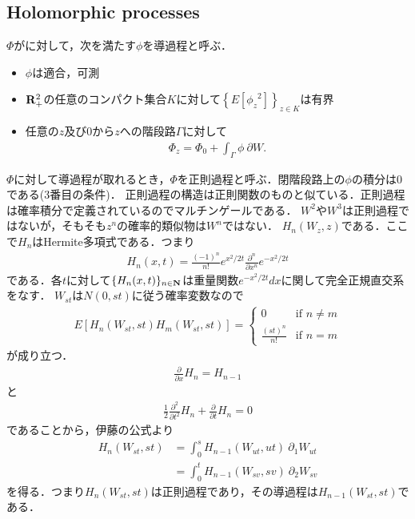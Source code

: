 \subsection{Holomorphic processes}
	$\Phi$がに対して，次を満たす$\phi$を導過程と呼ぶ．
	\begin{itemize}
		\item $\phi$は適合，可測
		\item $\mathbf{R}_{+}^{2}$の任意のコンパクト集合$K$に対して$\left\{E[{\phi_{z}}^{2}]\right\}_{z \in K}$は有界
		\item 任意の$z$及び$0$から$z$への階段路$\Gamma$に対して
			\begin{align}
				\Phi_{z} = \Phi_{0} + \int_{\Gamma} \phi\ \partial W.
			\end{align}
	\end{itemize}
	$\Phi$に対して導過程が取れるとき，$\Phi$を正則過程と呼ぶ．閉階段路上の$\phi$の積分は$0$である(3番目の条件)．
	正則過程の構造は正則関数のものと似ている．正則過程は確率積分で定義されているのでマルチンゲールである．
	$W^{2}$や$W^{3}$は正則過程ではないが，そもそも$z^{n}$の確率的類似物は$W^{n}$ではない．
	$H_{n}(W_{z},z)$である．ここで$H_{n}$はHermite多項式である．つまり
	\begin{align}
		H_{n}(x,t) = \frac{(-1)^{n}}{n!} e^{x^{2}/2t} \frac{\partial^{n}}{\partial x^{n}} e^{-x^{2}/2t}
	\end{align}
	である．各$t$に対して$\{H_{n}(x,t)\}_{n \in \mathbf{N}}$は重量関数$e^{-x^{2}/2t} dx$に関して完全正規直交系をなす．
	$W_{st}$は$N(0,st)$に従う確率変数なので
	\begin{align}
		E\left[H_{n}(W_{st},st) H_{m}(W_{st},st)\right]
		= \begin{cases}
			0 & \mbox{if } n \neq m \\
			\displaystyle \frac{(st)^{n}}{n!} & \mbox{if } n = m
		\end{cases}
	\end{align}
	が成り立つ．
	\begin{align}
		\frac{\partial}{\partial x} H_{n} = H_{n-1}
	\end{align}
	と
	\begin{align}
		\frac{1}{2} \frac{\partial^{2}}{\partial t^{2}} H_{n} + \frac{\partial}{\partial t} H_{n} = 0
	\end{align}
	であることから，伊藤の公式より
	\begin{align}
		H_{n}(W_{st},st) &= \int_{0}^{s} H_{n-1}(W_{ut},ut)\ \partial_{1} W_{ut} \\
		&= \int_{0}^{t} H_{n-1}(W_{sv},sv)\ \partial_{2} W_{sv}
	\end{align}
	を得る．つまり$H_{n}(W_{st},st)$は正則過程であり，その導過程は$H_{n-1}(W_{st},st)$である．
	

